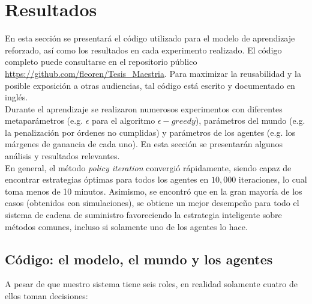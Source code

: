 \chapter{Resultados}
\label{ch:resultados}


En esta secci\'on se presentar\'a el c\'odigo utilizado para el modelo de aprendizaje reforzado, as\'i como los resultados en cada experimento realizado. El c\'odigo completo puede consultarse en el repositorio p\'ublico \url{https://github.com/fleoren/Tesis\_Maestria}. Para maximizar la reusabilidad y la posible exposici\'on a otras audiencias, tal c\'odigo est\'a escrito y documentado en ingl\'es.\\

Durante el aprendizaje se realizaron numerosos experimentos con diferentes metapar\'ametros (e.g. $\epsilon$ para el algoritmo $\epsilon-greedy$), par\'ametros del mundo (e.g. la penalizaci\'on por \'ordenes no cumplidas) y par\'ametros de los agentes (e.g. los m\'argenes de ganancia de cada uno). En esta secci\'on se presentar\'an algunos an\'alisis y resultados relevantes.\\

En general, el m\'etodo \textit{policy iteration} convergi\'o r\'apidamente, siendo capaz de encontrar estrategias \'optimas para todos los agentes en $10,000$ iteraciones, lo cual toma menos de 10 minutos. Asimismo, se encontr\'o que en la gran mayor\'ia de los casos (obtenidos con simulaciones), se obtiene un mejor desempe\~no para todo el sistema de cadena de suministro favoreciendo la estrategia inteligente sobre m\'etodos comunes, incluso si solamente uno de los agentes lo hace.

\section{C\'odigo: el modelo, el mundo y los agentes}

A pesar de que nuestro sistema tiene seis roles, en realidad solamente cuatro de ellos toman decisiones:

